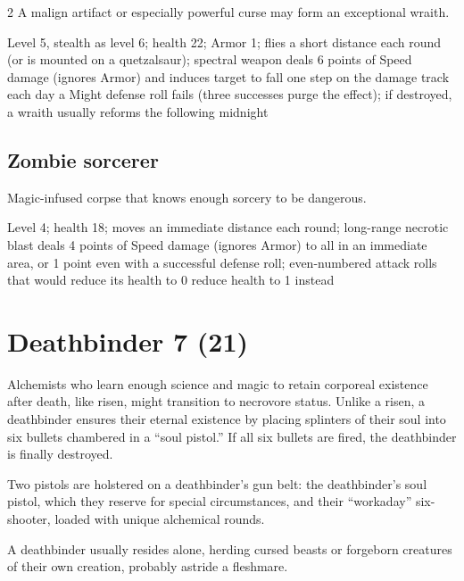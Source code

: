 \begin{multicols}{2}
A malign artifact or especially powerful curse may form an exceptional wraith. 

Level 5, stealth as level 6; health 22; Armor 1; flies a short distance each round (or is mounted on a quetzalsaur); spectral weapon deals 6 points of Speed damage (ignores Armor) and induces target to fall one step on the damage track each day a Might defense roll fails (three successes purge the effect); if destroyed, a wraith usually reforms the following midnight 

\subsection{Zombie sorcerer}

Magic-infused corpse that knows enough sorcery to be dangerous. 

Level 4; health 18; moves an immediate distance each round; long-range necrotic blast deals 4 points of Speed damage (ignores Armor) to all in an immediate area, or 1 point even with a successful defense roll; even-numbered attack rolls that would reduce its health to 0 reduce health to 1 instead

\section{Deathbinder 7 (21)}

Alchemists who learn enough science and magic to retain corporeal existence after death, like risen, might transition to necrovore status. Unlike a risen, a deathbinder ensures their eternal existence by placing splinters of their soul into six bullets chambered in a “soul pistol.” If all six bullets are fired, the deathbinder is finally destroyed. 

Two pistols are holstered on a deathbinder’s gun belt: the deathbinder’s soul pistol, which they reserve for special circumstances, and their “workaday” six-shooter, loaded with unique alchemical rounds. 

A deathbinder usually resides alone, herding cursed beasts or forgeborn creatures of their own creation, probably astride a fleshmare.


\end{multicols}

